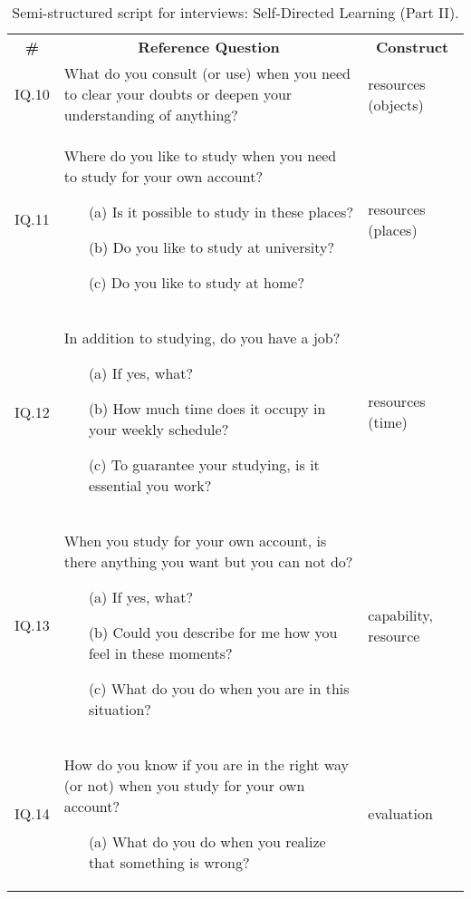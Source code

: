 \begin{table}[ht]
\caption{Semi-structured script for interviews: Self-Directed Learning (Part II).}
\label{tbl:sdl-script-part-ii}
\centering
{}
\begin{tabular}{
    p{1cm}
    p{9.5cm}
    p{2.5cm}
}
\hline

\multicolumn{1}{c}{\textbf{\#}} & \multicolumn{1}{c}{\textbf{Reference Question}} & \multicolumn{1}{c}{\textbf{Construct}}\\

\multicolumn{1}{c}{IQ.10} &
What do you consult (or use) when you need to clear your doubts or deepen your understanding of anything? &
resources (objects)\\

\multicolumn{1}{c}{IQ.11} &
Where do you like to study when you need to study for your own account?
\begin{enumerate}
    \item[(a)] Is it possible to study in these places?
    \item[(b)]  Do you like to study at university?
    \item[(c)] Do you like to study at home?
\end{enumerate} &
resources (places)\\

\multicolumn{1}{c}{IQ.12} &
In addition to studying, do you have a job?
\begin{enumerate}
    \item[(a)] If yes, what?
    \item[(b)]  How much time does it occupy in your weekly schedule?
    \item[(c)] To guarantee your studying, is it essential you work?
\end{enumerate} &
resources (time)\\

\multicolumn{1}{c}{IQ.13} &
When you study for your own account, is there anything you want but you can not do?
\begin{enumerate}
    \item[(a)] If yes, what?
    \item[(b)] Could you describe for me how you feel in these moments?
    \item[(c)] What do you do when you are in this situation?
\end{enumerate} &
capability, resource\\

\multicolumn{1}{c}{IQ.14} &
How do you know if you are in the right way (or not) when you study for your own account?
\begin{enumerate}
    \item[(a)] What do you do when you realize that something is wrong?
\end{enumerate} &
evaluation\\


\end{tabular}
\end{table}
